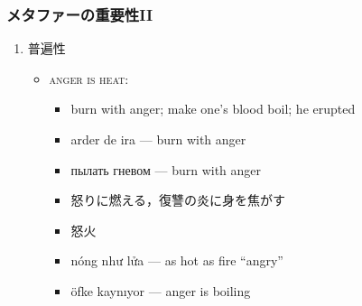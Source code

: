 \documentclass[11pt]{beamer}
\newlength{\la}
\let\oldcitep=\citep
\renewcommand\citep[1]{\hyperlink{#1}{\oldcitep{#1}}}
\newcommand\emoji[1]{\hspace{.25\zw}\raisebox{-2pt}{\href{https://commons.wikimedia.org/wiki/File:Emoji_#1.svg}{\texttt{[image: emoji/Emoji\_\#1.pdf]}}\hspace{.25\zw}}}
\newcommand\fire{\emoji{u1f525}}
\begin{document}
\begin{frame}
\frametitle{メタファーの重要性II}
\setlength{\leftmargini}{0em}
\begin{enumerate}
\addtocounter{enumi}{4}
    \item 普遍性 %

        \begin{itemize}
            \item[{\fire}] {\textsc{anger is heat}}:
                \begin{itemize}
                    \item burn with anger; make one’s blood boil; he erupted
                    \item arder de ira --- burn with anger
                    \item пылать гневом --- burn with anger
                    \item 怒りに燃える，復讐の炎に身を焦がす
                    \item 怒火
                    \item nóng như lửa --- as hot as fire “angry”
                    \item öfke kaynıyor --- anger is boiling \citep{aksan}
                \end{itemize}


\end{itemize}
\end{enumerate}
\end{frame}
\end{document}
